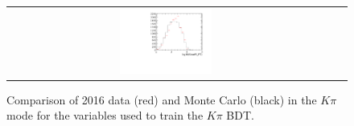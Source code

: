 \begin{figure}
\begin{tabular}{ccc}
\includegraphics[width=0.3\textwidth]{ANA_resources/Plots/Monte_carlo/data_vs_MC/Kpi/log10(KstarPi_PT)_2016.pdf} & & \\
\end{tabular}
\caption{Comparison of 2016 data (red) and Monte Carlo (black) in the $K\pi$ mode for the variables used to train the $K\pi$ BDT.}
\label{fig:data_vs_MC_Kpi_2016}
\end{figure}
